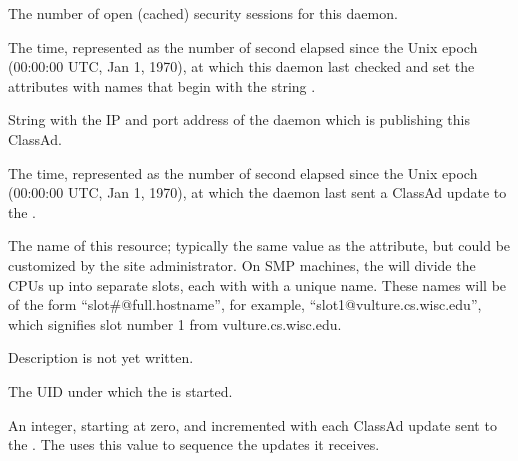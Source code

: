 \begin{description}
\item[\AdAttr{MonitorSelfSecuritySessions}:] The number of open (cached)
  security sessions for this daemon.

\item[\AdAttr{MonitorSelfTime}:] The  time, represented as the number of
  second elapsed since the Unix epoch (00:00:00 UTC, Jan 1, 1970),
  at which this daemon last checked and set the attributes with names that
  begin with the string .
  

\item[\AdAttr{MyAddress}:] String with the IP and port address of the
 daemon which is publishing this ClassAd.

\item[\AdAttr{MyCurrentTime}:] The time, represented as the number of
  second elapsed since the Unix epoch (00:00:00 UTC, Jan 1, 1970),
  at which the  daemon last sent a ClassAd update to the
  .

\item[\AdAttr{Name}:] The name of this resource; typically the same value as
  the  attribute, but could be customized by the site
  administrator.
  On SMP machines, the  will divide the CPUs up into separate
  slots, each with with a unique name.
  These names will be of the form ``slot\#@full.hostname'', for example,
  ``slot1@vulture.cs.wisc.edu'', which signifies slot number 1 from
  vulture.cs.wisc.edu.

\item[\AdAttr{PublicNetworkIpAddr}:] Description is not yet written.

\item[\AdAttr{RealUid}:] The UID under which the  is started.

\item[\AdAttr{UpdateSequenceNumber}:] An integer, starting at zero,
  and incremented with each ClassAd update sent to the .
  The  uses this value to sequence the updates it
  receives.

\end{description}

